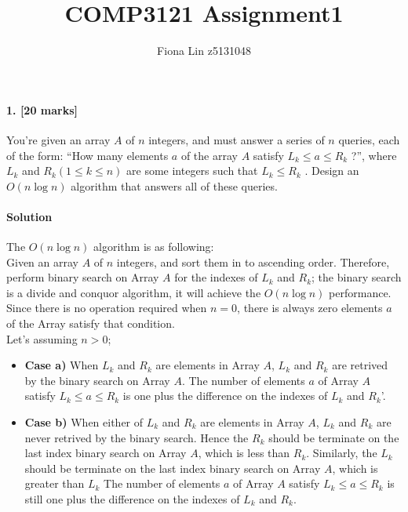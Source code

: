\documentclass[a4paper]{scrartcl}
\title{COMP3121 Assignment1}
\author{Fiona Lin z5131048}
\begin{document}
\maketitle

\paragraph{1. [20 marks]}
\label{sec:Question 1}
You're given an array $A$ of $n$ integers, and must answer a series of $n$ queries, each of the form: “How many elements $a$ of the array $A$ satisfy $L_k \leq a \leq R_k$ ?”, where $L_k$ and $R_k (1 \leq k \leq n)$ are some integers such that $L_k \leq R_k$ . Design an $O(n \log{n})$ algorithm that answers all of these queries.
\paragraph{Solution}
The $O(n\log{n})$ algorithm is as following:\\
Given an array $A$ of $n$ integers, and sort them in to ascending order. Therefore, perform binary search on Array $A$ for the indexes of $L_k$ and $R_k$; the binary search is a divide and conquor algorithm, it will achieve the $O(n\log{n})$ performance.\\
Since there is no operation required when $ n = 0$, there is always zero elements $a$ of the Array satisfy that condition.\\
Let's assuming $n > 0$;

\begin{itemize}
  \item {\bfseries Case a)} When $L_k$ and $R_k$ are elements in Array $A$, $L_k$ and $R_k$ are retrived by the binary search on Array $A$.
  The number of elements $a$ of Array $A$ satisfy $L_k \leq a \leq R_k$ is one plus the difference on the indexes of $L_k$ and $R_k$'.
  \item {\bfseries Case b)} When either of $L_k$ and $R_k$ are elements in Array $A$, $L_k$ and $R_k$ are never retrived by the binary search. Hence the $R_k$ should be terminate on the last index binary search on Array $A$, which is less than $R_k$. Similarly, the $L_k$ should be terminate on the last index binary search on Array $A$, which is greater than $L_k$
  The number of elements $a$ of Array $A$ satisfy $L_k \leq a \leq R_k$ is still one plus the difference on the indexes of $L_k$ and $R_k$.
\end{itemize}


\end{document}
